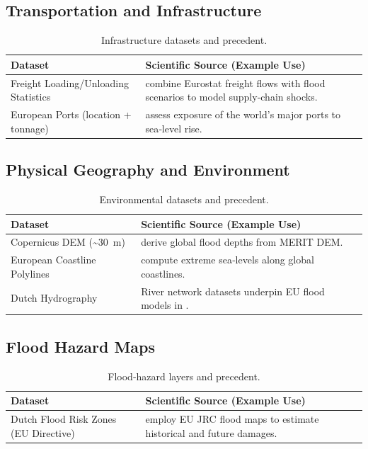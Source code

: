 \documentclass[a4paper,11pt]{article}
\begin{document}
\subsection{Transportation and Infrastructure}
\begin{table}[H]
\centering
\caption{Infrastructure datasets and precedent.}
\label{tab:infra}
\begin{tabularx}{\textwidth}{@{}l X@{}}
\toprule
\textbf{Dataset} & \textbf{Scientific Source (Example Use)} \\ \midrule
Freight Loading/Unloading Statistics & \citet{Betts2017} combine Eurostat freight flows with flood scenarios to model supply‑chain shocks. \\ 
European Ports (location + tonnage) & \citet{Hanson2011} assess exposure of the world’s major ports to sea‑level rise. \\ \bottomrule
\end{tabularx}
\end{table}

\subsection{Physical Geography and Environment}
\begin{table}[H]
\centering
\caption{Environmental datasets and precedent.}
\label{tab:phys}
\begin{tabularx}{\textwidth}{@{}l X@{}}
\toprule
\textbf{Dataset} & \textbf{Scientific Source (Example Use)} \\ \midrule
Copernicus DEM (\textasciitilde{}\SI{30}{m}) & \citet{Wing2021} derive global flood depths from MERIT DEM. \\ 
European Coastline Polylines & \citet{Vousdoukas2018} compute extreme sea‑levels along global coastlines. \\ 
Dutch Hydrography & River network datasets underpin EU flood models in \citet{Alfieri2016}. \\ \bottomrule
\end{tabularx}
\end{table}

\subsection{Flood Hazard Maps}
\begin{table}[H]
\centering
\caption{Flood‑hazard layers and precedent.}
\label{tab:hazard}
\begin{tabularx}{\textwidth}{@{}l X@{}}
\toprule
\textbf{Dataset} & \textbf{Scientific Source (Example Use)} \\ \midrule
Dutch Flood Risk Zones (EU Directive) & \citet{Dottori2016} employ EU JRC flood maps to estimate historical and future damages. \\ \bottomrule
\end{tabularx}
\end{table}
\end{document}
